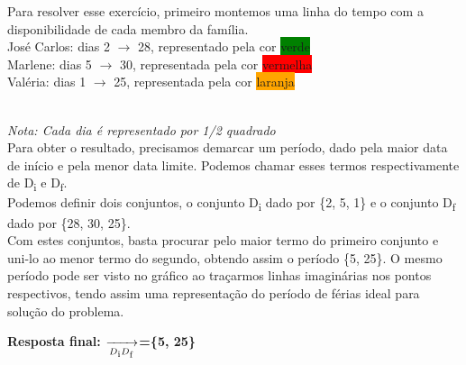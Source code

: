 \begin{solution}{}{}

    Para resolver esse exercício, primeiro montemos uma linha do tempo com a disponibilidade de cada membro da família. \\
    José Carlos: dias 2 $\rightarrow$ 28, representado pela cor \colorbox{green}{verde} \\
    Marlene: dias 5 $\rightarrow$ 30, representada pela cor \colorbox{red}{vermelha}\\
    Valéria: dias 1 $\rightarrow$ 25, representada pela cor \colorbox{orange}{laranja}\\
    
    \\
    \textit{Nota: Cada dia é representado por 1/2 quadrado}\\

    Para obter o resultado, precisamos demarcar um período, dado pela maior data de início e pela menor data limite. Podemos chamar esses termos respectivamente de D\textsubscript{i} e D\textsubscript{f}. \\
    Podemos definir dois conjuntos, o conjunto D\textsubscript{i} dado por \{{2, 5, 1}\} e o conjunto D\textsubscript{f} dado por \{{28, 30, 25}\}. \\
    Com estes conjuntos, basta procurar pelo maior termo do primeiro conjunto e uni-lo ao menor termo do segundo, obtendo assim o período \{{5, 25}\}. O mesmo período pode ser visto no gráfico ao traçarmos linhas imaginárias nos pontos respectivos, tendo assim uma representação do período de férias ideal para solução do problema.

    \textbf{Resposta final: $\xrightarrow[D\textsubscript{i}D\textsubscript{f}]{}$=\{{5, 25}\}}
\end{solution}

